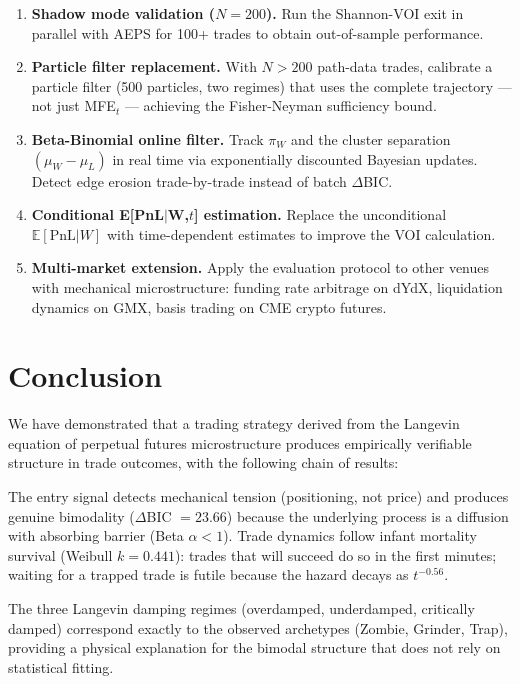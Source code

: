 \documentclass[11pt,a4paper]{article}
\newcommand{\E}{\mathbb{E}}
\begin{document}
\begin{enumerate}[leftmargin=2em]
\item \textbf{Shadow mode validation ($N = 200$).} Run the Shannon-VOI exit in parallel with AEPS for 100+ trades to obtain out-of-sample performance.
\item \textbf{Particle filter replacement.} With $N > 200$ path-data trades, calibrate a particle filter (500 particles, two regimes) that uses the complete trajectory --- not just MFE$_t$ --- achieving the Fisher-Neyman sufficiency bound.
\item \textbf{Beta-Binomial online filter.} Track $\pi_W$ and the cluster separation $(\mu_W - \mu_L)$ in real time via exponentially discounted Bayesian updates. Detect edge erosion trade-by-trade instead of batch $\Delta$BIC.
\item \textbf{Conditional E[PnL$|$W,$t$] estimation.} Replace the unconditional $\E[\text{PnL}|W]$ with time-dependent estimates to improve the VOI calculation.
\item \textbf{Multi-market extension.} Apply the evaluation protocol to other venues with mechanical microstructure: funding rate arbitrage on dYdX, liquidation dynamics on GMX, basis trading on CME crypto futures.
\end{enumerate}


\section{Conclusion}
\label{sec:conclusion}

We have demonstrated that a trading strategy derived from the Langevin equation of perpetual futures microstructure produces empirically verifiable structure in trade outcomes, with the following chain of results:

The entry signal detects mechanical tension (positioning, not price) and produces genuine bimodality ($\Delta$BIC $= 23.66$) because the underlying process is a diffusion with absorbing barrier (Beta $\alpha < 1$). Trade dynamics follow infant mortality survival (Weibull $k = 0.441$): trades that will succeed do so in the first minutes; waiting for a trapped trade is futile because the hazard decays as $t^{-0.56}$.

The three Langevin damping regimes (overdamped, underdamped, critically damped) correspond exactly to the observed archetypes (Zombie, Grinder, Trap), providing a physical explanation for the bimodal structure that does not rely on statistical fitting.
\end{document}
